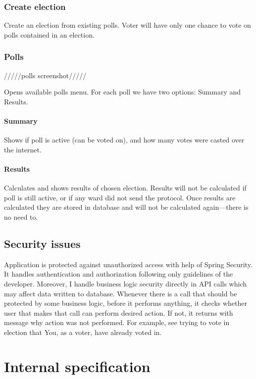 \documentclass[a4paper,twoside,12pt]{book}
\begin{document}
    \subsection{Create election}
      Create an election from existing polls. Voter will have only one chance to vote on polls contained in an election.

    \subsection{Polls}

      /////polls screenshot/////

      Opens available polls menu. For each poll we have two options: Summary and Results.

      \subsubsection{Summary}
        Shows if poll is active (can be voted on), and how many votes were casted over the internet.

      \subsubsection{Results}
        Calculates and shows results of chosen election. Results will not be calculated if poll is still active, or if any ward did not send the protocol.
        Once results are calculated they are stored in database and will not be calculated again---there is no need to.

  \section{Security issues}
    Application is protected against unauthorized access with help of Spring Security. It handles authentication and authorization following only guidelines of the developer.
    Moreover, I handle business logic security directly in API calls which may affect data written to database. 
    Whenever there is a call that should be protected by some business logic, before it performs anything, 
    it checks whether user that makes that call can perform desired action. If not, it returns with message why action was not performed. 
    For example, see trying to vote in election that You, as a voter, have already voted in.

\chapter{Internal specification}
\end{document}
